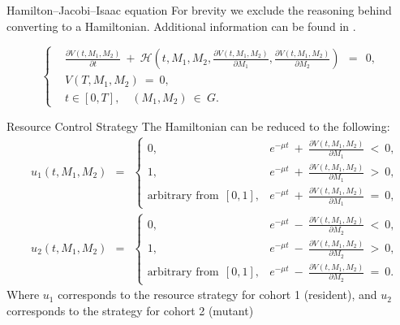 \documentclass{beamer}
\begin{document}
\begin{frame}{Hamilton--Jacobi--Isaac equation}
    For brevity we exclude the reasoning behind converting to a Hamiltonian. Additional information can be found in \cite{YegorovGrognardMailleretHalkettBernhard2019}.\newline
    
    \begin{equation}
        \left\{ 
            \begin{aligned}
                & \frac{\partial V(t, M_1, M_2)}{\partial t} \: + \: \mathcal{H}
                \left( t, M_1, M_2, \frac{\partial V(t, M_1, M_2)}{\partial M_1},
                \frac{\partial V(t, M_1, M_2)}{\partial M_2} \right) \:\: = \:\: 0, \\
                & V(T, M_1, M_2) \: = \: 0, \\
                & t \in [0, T], \quad (M_1, M_2) \: \in \: G.
            \end{aligned} 
        \right.  
        \label{15}
    \end{equation}
\end{frame}

\begin{frame}{Resource Control Strategy}
    The Hamiltonian can be reduced to the following:
    \begin{equation}
        \begin{aligned}
            & u_1(t, M_1, M_2) \:\: = \:\: 
            \begin{cases}
                0, & e^{-\mu t} \: + \: \frac{\partial V(t, M_1, M_2)}{\partial M_1}
                 \: < \: 0, \\
                1, & e^{-\mu t} \: + \: \frac{\partial V(t, M_1, M_2)}{\partial M_1}
                \: > \: 0, \\
                \mbox{arbitrary from} \:\: [0, 1], & e^{-\mu t} \: + \: \frac{\partial
                V(t, M_1, M_2)}{\partial M_1} \: = \: 0,
            \end{cases} \\
            & u_2(t, M_1, M_2) \:\: = \:\: 
            \begin{cases}
                0, & e^{-\mu t} \: - \: \frac{\partial V(t, M_1, M_2)}{\partial M_2}
                \: < \: 0, \\
                1, & e^{-\mu t} \: - \: \frac{\partial V(t, M_1, M_2)}{\partial M_2}
                \: > \: 0, \\
                \mbox{arbitrary from} \:\: [0, 1], & e^{-\mu t} \: - \: \frac{\partial V(t,
                M_1, M_2)}{\partial M_2} \: = \: 0.
            \end{cases}
        \end{aligned}  
        \label{16}
    \end{equation}
    Where $u_1$ corresponds to the resource strategy for cohort 1 (resident), and $u_2$ corresponds to the strategy for cohort 2 (mutant)
\end{frame}
\end{document}
